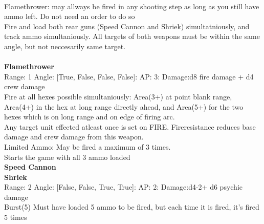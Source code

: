 \ \\
Flamethrower: may allways be fired in any shooting step as long as you still have ammo left. Do not need an order to do so\\ 
Fire and load both rear guns (Speed Cannon and Shriek) simultatniously, and track ammo simultaniously. All targets of both weapons must be within the same angle, but not neccesarily same target.\\ 

\ \\
{\bf Flamethrower } \\



Range: 1  Angle: [True, False, False, False]: AP: 3: Damage:d8 fire damage + d4 crew damage \\
Fire at all hexes possible simultaniously: Area(3+) at point blank range, Area(4+) in the hex at long range directly ahead, and Area(5+) for the two hexes which is on long range and on edge of firing arc. \\ 
 Any target unit effected atleast once is set on FIRE. Fireresistance reduces base damage and crew damage from this weapon. \\ 
 Limited Ammo: May be fired a maximum of 3 times. \\ 
 Starts the game with all 3 ammo loaded\\ 




{\bf Speed Cannon } \\






{\bf Shriek } \\



Range: 2  Angle: [False, False, True, True]: AP: 2: Damage:d4-2+ d6 psychic damage \\
Burst(5) Must have loaded 5 ammo to be fired, but each time it is fired, it's fired 5 times\\ 




 
\ \\



